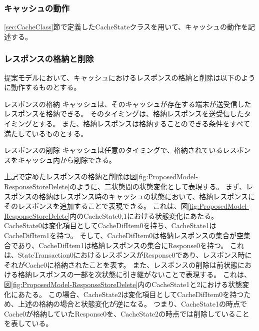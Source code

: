 \documentclass[journal]{IEEEtran}
\begin{document}
\subsubsection{キャッシュの動作}
\ref{sec:CacheClass}節で定義したCacheStateクラスを用いて、キャッシュの動作を記述する。

\subsubsection{レスポンスの格納と削除}
提案モデルにおいて、キャッシュにおけるレスポンスの格納と削除は以下のように動作するものとする。

\begin{itembox}[l]{レスポンスの格納}
キャッシュは、そのキャッシュが存在する端末が送受信したレスポンスを格納できる。
そのタイミングは、格納レスポンスを送受信したタイミングとする。
また、格納レスポンスは格納することのできる条件をすべて満たしているものとする。
\end{itembox}

\begin{itembox}[l]{レスポンスの削除}
キャッシュは任意のタイミングで、格納されているレスポンスをキャッシュ内から削除できる。
\end{itembox}

上記で定めたレスポンスの格納と削除は図\ref{fig:ProposedModel-ResponseStoreDelete}のように、二状態間の状態変化として表現する。
まず、レスポンスの格納はレスポンス時のキャッシュの状態において、格納レスポンスにそのレスポンスを追加することで表現できる。
これは、図\ref{fig:ProposedModel-ResponseStoreDelete}内のCacheState0,1における状態変化にあたる。
CacheState0は変化項目としてCacheDifItem0を持ち、CacheState1はCacheDifItem1を持つ。
そして、CacheDifItem0は格納レスポンスの集合が空集合であり、CacheDifItem1は格納レスポンスの集合にResponse0を持つ。
これは、StateTransaction0におけるレスポンスがResponse0であり、レスポンス時にそれがCache0に格納されたことを表す。
また、レスポンスの削除は前状態における格納レスポンスの一部を次状態に引き継がないことで表現する。
これは、図\ref{fig:ProposedModel-ResponseStoreDelete}内のCacheState1と2における状態変化にあたる。
この場合、CacheState2は変化項目としてCacheDifItem0を持つため、上述の格納の場合と状態変化が逆になる。
つまり、CacheState1の時点でCache0が格納していたResponse0を、CacheState2の時点では削除していることを表している。

\end{document}
